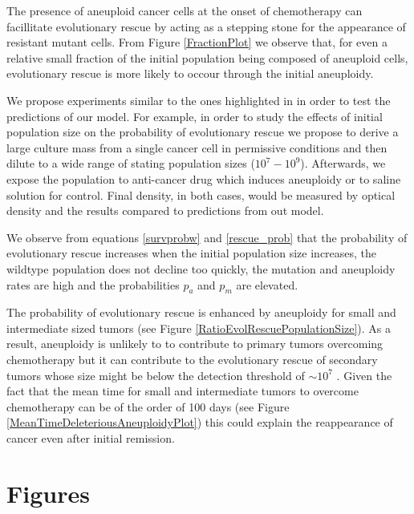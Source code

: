 \documentclass[12pt]{extarticle}
\begin{document}
The presence of aneuploid cancer cells at the onset of chemotherapy can facillitate evolutionary rescue by acting as a stepping stone for the appearance of resistant mutant cells. From Figure \ref{FractionPlot} we observe that, for even a relative small fraction of the initial population being composed of aneuploid cells, evolutionary rescue is more likely to occour through the initial aneuploidy.

We propose experiments similar to the ones highlighted in \citep{martin2013probability} in order to test the predictions of our model. For example, in order to study the effects of initial population size on the probability of evolutionary rescue we propose to derive a large culture mass from a single cancer cell in permissive conditions and then dilute to a wide range of stating population sizes ($10^7-10^9$). Afterwards, we expose the population to anti-cancer drug which induces aneuploidy or to saline solution for control. Final density, in both cases, would be measured by optical density and the results compared to predictions from out model.

We observe from equations \eqref{survprobw} and \eqref{rescue_prob} that the probability of evolutionary rescue increases when the initial population size increases, the wildtype population does not decline too quickly, the mutation and aneuploidy rates are high and the probabilities $p_a$ and $p_m$ are elevated.

The probability of evolutionary rescue is enhanced by aneuploidy for small and intermediate sized tumors (see Figure \ref{RatioEvolRescuePopulationSize}). As a result, aneuploidy is unlikely to to contribute to primary tumors overcoming chemotherapy but it can contribute to the evolutionary rescue of secondary tumors whose size might be below the detection threshold of $\sim10^7$  \citep{bozic2013evolutionary}. Given the fact that the mean time for small and intermediate tumors to overcome chemotherapy can be of the order of 100 days (see Figure \ref{MeanTimeDeleteriousAneuploidyPlot})  this could explain the reappearance of cancer even after initial remission.


\section*{Figures}
\end{document}
